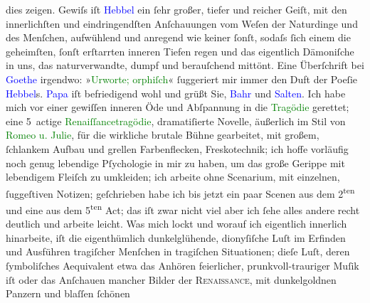                dies zeigen. Gewiſs iſt \textcolor{blue}{Hebbel}{}\ledrightnote{\textcolor{blue}{Friedrich Hebbel}} ein ſehr großer,
               tiefer und reicher Geiſt, mit den innerlichſten und eindringendſten {\pb}Anſchauungen vom Weſen der
               Naturdinge und des Menſchen, aufwühlend und anregend wie keiner ſonſt, sodaſs ſich
               einem die geheimſten, ſonſt erſtarrten inneren Tiefen regen und das eigentlich
               Dämoniſche in uns, das naturverwandte, dumpf und berauſchend mittönt. Eine
               Überſchrift bei \textcolor{blue}{Goethe}{}\ledrightnote{\textcolor{blue}{Johann Wolfgang von Goethe}} irgendwo: »\textcolor{green}{Urworte; orphiſch}{}\ledrightnote{\textcolor{green}{Urworte. Orphisch}}« ſuggeriert mir immer den Duft der Poeſie \textcolor{blue}{Hebbel}{}\ledrightnote{\textcolor{blue}{Friedrich Hebbel}}s.\pend
           \pstart
           \textcolor{blue}{Papa}{} iſt befriedigend wohl und
               grüßt Sie, \textcolor{blue}{Bahr}{}\ledrightnote{\textcolor{blue}{Hermann Bahr}} und \textcolor{blue}{Salten}{}\ledrightnote{\textcolor{blue}{Felix Salten}}.\pend
           \pstart
           Ich habe mich vor einer gewiſſen inneren Öde und Abſpannung in die \textcolor{green}{Tragödie}{} gerettet; eine 5 actige \textcolor{green}{Renaiſſancetragödie}{}, dramatiſierte
               Novelle, äußerlich im Stil von \textcolor{green}{Romeo u. Julie}{}\ledrightnote{\textcolor{green}{Romeo und Julia}}, für
               die wirkliche brutale Bühne gearbeitet, mit {\pb}großem, ſchlankem Aufbau und
               grellen Farbenflecken, Freskotechnik; ich hoffe vorläufig noch genug lebendige
               Pſychologie in mir zu haben, um das große Gerippe mit lebendigem Fleiſch zu
               umkleiden; ich arbeite ohne Scenarium, mit einzelnen, ſuggeſtiven Notizen;
               geſchrieben habe ich bis jetzt ein paar Scenen aus dem 2\textsuperscript{ten} und eine aus dem 5\textsuperscript{ten} Act; das iſt zwar
               nicht viel aber ich ſehe alles andere recht deutlich und arbeite leicht. Was mich
               lockt und worauf ich eigentlich innerlich hinarbeite, iſt die eigenthümlich
               dunkelglühende, dionyſiſche Luſt im Erfinden und Ausführen tragiſcher Menſchen in
               tragiſchen Situationen; dieſe Luſt, deren ſymboliſches Aequivalent etwa das Anhören
                  {\pb}feierlicher,
               prunkvoll-trauriger Muſik iſt oder das Anſchauen mancher Bilder der \textsc{Renaissance}, mit dunkelgoldnen Panzern und blaſſen ſchönen

